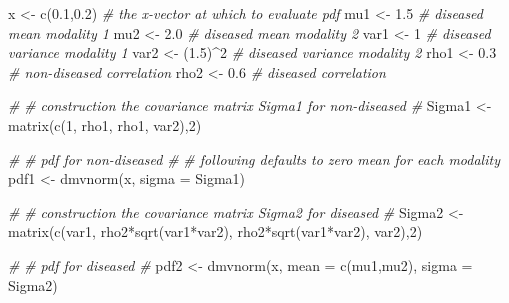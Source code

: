 \documentclass[
]{book}
\newenvironment{Shaded}{\begin{snugshade}}{\end{snugshade}}
\newcommand{\AttributeTok}[1]{\textcolor[rgb]{0.77,0.63,0.00}{#1}}
\newcommand{\CommentTok}[1]{\textcolor[rgb]{0.56,0.35,0.01}{\textit{#1}}}
\newcommand{\DecValTok}[1]{\textcolor[rgb]{0.00,0.00,0.81}{#1}}
\newcommand{\FloatTok}[1]{\textcolor[rgb]{0.00,0.00,0.81}{#1}}
\newcommand{\FunctionTok}[1]{\textcolor[rgb]{0.00,0.00,0.00}{#1}}
\newcommand{\NormalTok}[1]{#1}
\newcommand{\OtherTok}[1]{\textcolor[rgb]{0.56,0.35,0.01}{#1}}
\newcommand{\SpecialCharTok}[1]{\textcolor[rgb]{0.00,0.00,0.00}{#1}}
\begin{document}
\begin{Shaded}
\begin{Highlighting}[]
\NormalTok{x }\OtherTok{\textless{}{-}} \FunctionTok{c}\NormalTok{(}\FloatTok{0.1}\NormalTok{,}\FloatTok{0.2}\NormalTok{) }\CommentTok{\# the x{-}vector at which to evaluate pdf}
\NormalTok{mu1 }\OtherTok{\textless{}{-}} \FloatTok{1.5} \CommentTok{\# diseased mean modality 1}
\NormalTok{mu2 }\OtherTok{\textless{}{-}} \FloatTok{2.0} \CommentTok{\# diseased mean modality 2}
\NormalTok{var1 }\OtherTok{\textless{}{-}} \DecValTok{1}  \CommentTok{\# diseased variance modality 1}
\NormalTok{var2 }\OtherTok{\textless{}{-}}\NormalTok{ (}\FloatTok{1.5}\NormalTok{)}\SpecialCharTok{\^{}}\DecValTok{2} \CommentTok{\# diseased variance modality 2}
\NormalTok{rho1 }\OtherTok{\textless{}{-}} \FloatTok{0.3} \CommentTok{\# non{-}diseased correlation}
\NormalTok{rho2 }\OtherTok{\textless{}{-}} \FloatTok{0.6} \CommentTok{\# diseased correlation}

\CommentTok{\#}
\CommentTok{\# construction the covariance matrix Sigma1 for non{-}diseased}
\CommentTok{\# }
\NormalTok{Sigma1 }\OtherTok{\textless{}{-}} \FunctionTok{matrix}\NormalTok{(}\FunctionTok{c}\NormalTok{(}\DecValTok{1}\NormalTok{, rho1, rho1, var2),}\DecValTok{2}\NormalTok{)}

\CommentTok{\#}
\CommentTok{\# pdf for non{-}diseased}
\CommentTok{\# }
\CommentTok{\# following defaults to zero mean for each modality}
\NormalTok{pdf1  }\OtherTok{\textless{}{-}} \FunctionTok{dmvnorm}\NormalTok{(x, }\AttributeTok{sigma =}\NormalTok{ Sigma1) }

\CommentTok{\#}
\CommentTok{\# construction the covariance matrix Sigma2 for diseased}
\CommentTok{\# }
\NormalTok{Sigma2 }\OtherTok{\textless{}{-}} \FunctionTok{matrix}\NormalTok{(}\FunctionTok{c}\NormalTok{(var1, rho2}\SpecialCharTok{*}\FunctionTok{sqrt}\NormalTok{(var1}\SpecialCharTok{*}\NormalTok{var2), rho2}\SpecialCharTok{*}\FunctionTok{sqrt}\NormalTok{(var1}\SpecialCharTok{*}\NormalTok{var2), var2),}\DecValTok{2}\NormalTok{)}

\CommentTok{\#}
\CommentTok{\# pdf for diseased}
\CommentTok{\# }
\NormalTok{pdf2  }\OtherTok{\textless{}{-}} \FunctionTok{dmvnorm}\NormalTok{(x, }\AttributeTok{mean =} \FunctionTok{c}\NormalTok{(mu1,mu2), }\AttributeTok{sigma =}\NormalTok{ Sigma2)}


\end{Highlighting}
\end{Shaded}
\end{document}
